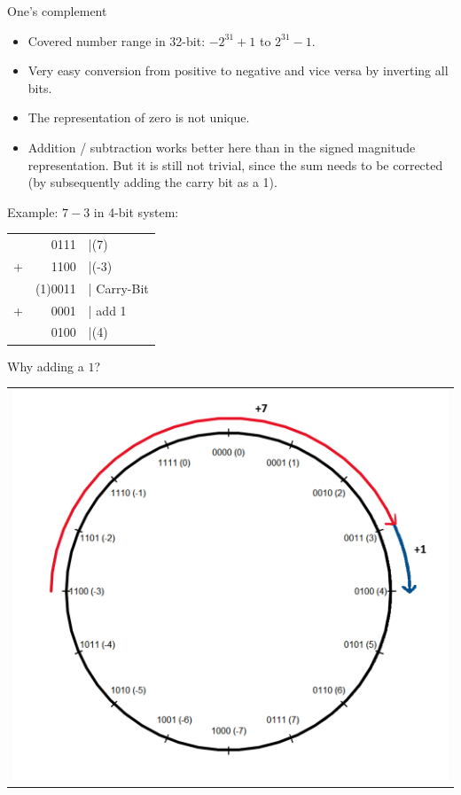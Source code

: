\begin{vbframe}{One's complement}
\framebreak
\begin{itemize}
\item Covered number range in 32-bit: $-2^{31}+1$ to $2^{31}-1$.
\item Very easy conversion from positive to negative and vice versa by inverting all bits.
\item The representation of zero is not unique.
\item Addition / subtraction works better here than in the signed magnitude representation. But it is still not trivial, since the sum needs to be corrected (by subsequently adding the carry bit as a 1).
\end{itemize}

Example: $7 - 3$ in 4-bit system:

\begin{center}
  \begin{tabular}{crl}
    &0111  &|(7)\\
    +&1100  &|(-3)\\\hline
    &(1)0011 &| Carry-Bit \\
    +&0001 &| add 1\\\hline
    &0100&|(4)
  \end{tabular}
\end{center}

\framebreak

Why adding a $1$?

\begin{center}
\begin{tabular}{l}
\includegraphics[width=0.4\paperwidth]{figure_man/1complement}
\end{tabular}
\end{center}


\end{vbframe}
